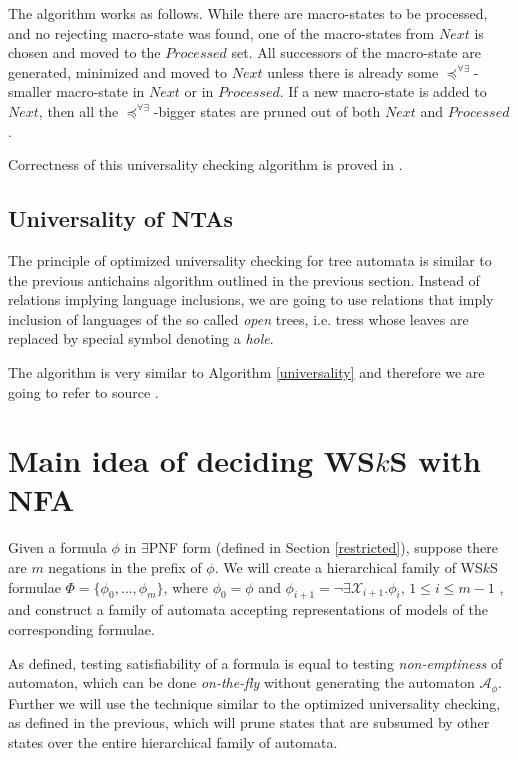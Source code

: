 The algorithm works as follows. While there are macro-states to be processed,
and no rejecting macro-state was found, one of the macro-states from $Next$ is
chosen and moved to the $Processed$ set. All successors of the macro-state are
generated, minimized and moved to $Next$ unless there is already some
$\preceq^{\forall\exists}$-smaller macro-state in $Next$ or in $Processed$. If a
new macro-state is added to $Next$, then all the
$\preceq^{\forall\exists}$-bigger states are pruned out of both $Next$ and
$Processed$.
	
Correctness of this universality checking algorithm is proved in \cite{tacas}.

\subsection{Universality of NTAs}

The principle of optimized universality checking for tree automata is similar to
the previous antichains algorithm outlined in the previous section. Instead of
relations implying language inclusions, we are going to use relations that imply
inclusion of languages of the so called \emph{open} trees, i.e. tress whose
leaves are replaced by special symbol denoting a \emph{hole}.

The algorithm is very similar to Algorithm \ref{universality} and therefore we
are going to refer to source \cite{tacas}.

\section{Main idea of deciding WS$k$S with NFA}

Given a formula $\phi$ in $\exists$PNF form (defined in Section
\ref{restricted}), suppose there are $m$ negations in the prefix of $\phi$. We
will create a hierarchical family of WS$k$S formulae $\Phi =
\{\phi_0,\ldots,\phi_m\}$, where $\phi_0 = \phi$ and $\phi_{i+1} =
\neg\exists\mathcal{X}_{i+1}.\phi_i$, $1 \leq i \leq m-1$ , and construct a
family of automata accepting representations of models of the corresponding
formulae.

As defined, testing satisfiability of a formula is equal to testing
\emph{non-emptiness} of automaton, which can be done \emph{on-the-fly} without
generating the automaton $\mathcal{A}_\phi$. Further we will use the technique
similar to the optimized universality checking, as defined in the previous,
which will prune states that are subsumed by other states over the entire
hierarchical family of automata.

